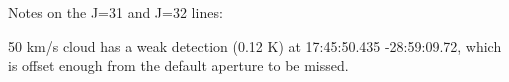 Notes on the J=31 and J=32 lines:

50 km/s cloud has a weak detection (0.12 K) at 17:45:50.435 -28:59:09.72, which is offset enough from the default aperture to be missed.

